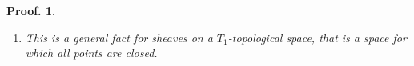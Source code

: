 \documentclass[a4paper, english, 11pt]{article}
\newcommand{\kk}[0]{\textbf{k}}
\newcommand{\0}{\vec{0}}
\newcommand{\Hom}[0]{\text{Hom}}
\newtheorem*{pf}{Proof.} }
\begin{document}
\begin{pf}
\begin{enumerate}
     
     Now if $\varprojlim\limits_{]-x;y[\ni \alpha}M((x,y))$ is finite dimensional then the above product in the right hand side of~\eqref{eq:porjlimM} is a finite product and thus a direct sum: 
     $\prod_{\substack{I\in \mathbb{B}(M\circ G)\\ 0 \in \text{closure}(I)}} \kk \; \simeq \; \bigoplus_{\substack{I\in \mathbb{B}(M\circ G)\\ 0 \in \text{closure}(I)}}.$ Therefore we have 
     \begin{align*}
        \varprojlim_{]-x;y[\ni \alpha}M((x,y))%
        & \simeq \bigoplus_{\substack{I\in \mathbb{B}(M\circ G)\\ 0 \in \text{closure}(I)}} \kk  \\
        &\simeq \varprojlim_{]-x;y[\ni \alpha} \Hom \left ( M((x,y)), \kk \right ) \; \text{ (by~\eqref{eq:DefMoG} and finite dimensionality)}\\ 
        &\simeq \tilde{M}_\alpha \; \text{ (by~\eqref{eq:defMtilde})}\\
        &\simeq \overline{M}_\alpha.
    \end{align*}
    \item This is a general fact for sheaves on a $T_1$-topological space, that is a space for which all   points are closed.
\end{enumerate}
\end{pf}
\end{document}
